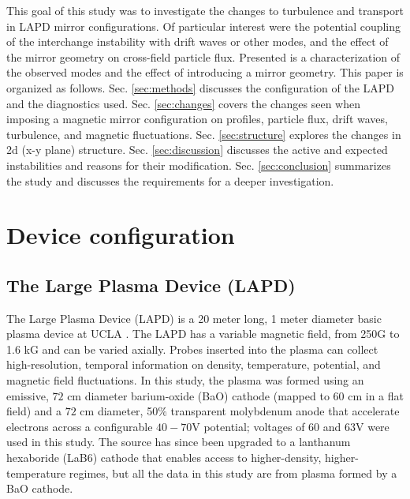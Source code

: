 This goal of this study was to investigate the changes to turbulence and transport in LAPD mirror configurations. Of particular interest were the potential coupling of the interchange instability with drift waves or other modes, and the effect of the mirror geometry on cross-field particle flux. Presented is a characterization of the observed modes and the effect of introducing a mirror geometry.
This paper is organized as follows. Sec. \ref{sec:methods} discusses the configuration of the LAPD and the diagnostics used. Sec. \ref{sec:changes} covers the changes seen when imposing a magnetic mirror configuration on profiles, particle flux, drift waves, turbulence, and magnetic fluctuations. Sec. \ref{sec:structure} explores the changes in 2d (x-y plane) structure. Sec. \ref{sec:discussion} discusses the active and expected instabilities and reasons for their modification. Sec. \ref{sec:conclusion} summarizes the study and discusses the requirements for a deeper investigation.

\section{\label{sec:methods}Device configuration}

\subsection{\label{sec:sub_exp}The Large Plasma Device (LAPD)}
The Large Plasma Device (LAPD) is a 20 meter long, 1 meter diameter basic plasma device at UCLA \cite{LAPD_BaO}. The LAPD has a variable magnetic field, from 250G to 1.6 kG and can be varied axially. Probes inserted into the plasma can collect high-resolution, temporal information on density, temperature, potential, and magnetic field fluctuations. In this study, the plasma was formed using an emissive, $72$ cm  diameter barium-oxide (BaO) cathode (mapped to 60 cm in a flat field) and a $72$ cm diameter, 50\% transparent molybdenum anode that accelerate electrons across a configurable $40-70$V potential; voltages of $60$ and $63$V were used in this study. The source has since been upgraded to a lanthanum hexaboride (LaB6) cathode \cite{LAPD_LaB6} that enables access to higher-density, higher-temperature regimes, but all the data in this study are from plasma formed by a BaO cathode. 

